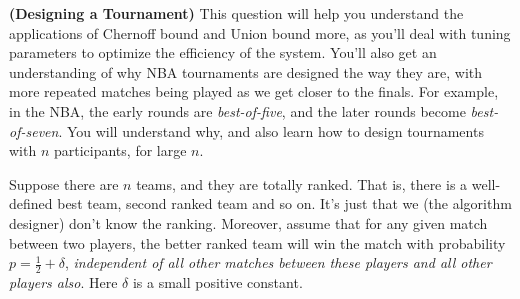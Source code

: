 \documentclass[solution,addpoints,12pt]{exam}
\begin{document}
\begin{questions}


\question[10] \textbf{(Designing a Tournament)}  This question will help you understand the applications of Chernoff bound and Union bound more, as you'll deal with tuning parameters to optimize the efficiency of the system. You'll also get an understanding of why NBA tournaments are designed the way they are, with more repeated matches being played as we get closer to the finals. For example, in the NBA, the early rounds are \emph{best-of-five}, and the later rounds become \emph{best-of-seven}. You will understand why, and also learn how to design tournaments with $n$ participants, for large $n$.

Suppose there are $n$ teams, and they are totally ranked. That is, there is a well-defined best team, second ranked team and so on. It's just that we (the algorithm designer) don't know the ranking. Moreover, assume that for any given match between two players, the better ranked team will win the match with probability $p = \frac12 + \delta$, \emph{independent of all other matches between these players and all other players also}. Here $\delta$ is a small positive constant.

\end{questions}
\end{document}
